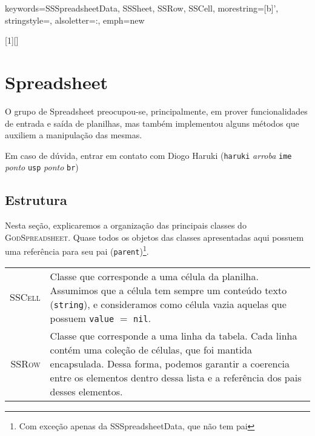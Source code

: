 {

\def\godss{\textsc{GodSpreadsheet}}

\def\classe#1{\textsc{#1}}
\def\code#1{\texttt{#1}}


%

  {keywords={SSSpreadsheetData, SSSheet, SSRow, SSCell},
  morestring=[b]{'},
  stringstyle=\color{purple},
  alsoletter={:}, 
  emph={new}
  }


[1][]
{
\lstset{language=GODSpreadsheet,
    #1}
}
{}


\section{Spreadsheet}

O grupo de Spreadsheet preocupou-se, principalmente, em prover
funcionalidades de entrada e saída de planilhas, mas também implementou
alguns métodos que auxiliem a manipulação das mesmas.

Em caso de dúvida, entrar em contato com Diogo Haruki (\texttt{haruki} \textit{arroba} \texttt{ime} \textit{ponto} \texttt{usp} \textit{ponto} \texttt{br})

\subsection{Estrutura}
Nesta seção, explicaremos a organização das principais classes do
\godss. Quase todos os objetos das classes apresentadas
aqui possuem uma referência para seu pai (\code{parent})\footnote{Com
exceção apenas da SSSpreadsheetData, que não tem pai}.

\begin{tabular}{r p{}}
\classe{SSCell} &  Classe que corresponde a uma célula da planilha.
Assumimos que a célula tem sempre um conteúdo texto (\code{string}), e
consideramos como célula vazia aquelas que possuem \code{value} $=$
\texttt{nil}.\\

\classe{SSRow} & Classe que corresponde a uma linha da tabela.
Cada linha contém uma coleção de células, que foi mantida encapsulada.
Dessa forma, podemos garantir a coerencia entre os elementos dentro dessa
lista e a referência dos pais desses elementos.\\


\end{tabular}}
